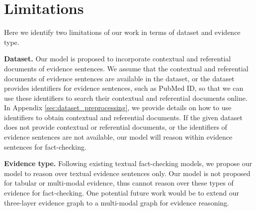 \section*{Limitations}

Here we identify two limitations of our work in terms of dataset and evidence type.

\textbf{Dataset.} Our model is proposed to incorporate contextual and referential documents of evidence sentences. We assume that the contextual and referential documents of evidence sentences are available in the dataset, or the dataset provides identifiers for evidence sentences, such as PubMed ID, so that we can use these identifiers to search their contextual and referential documents online. In Appendix \ref{sec:dataset_preprocessing}, we provide details on how to use identifiers to obtain contextual and referential documents. If the given dataset does not provide contextual or referential documents, or the identifiers of evidence sentences are not available, our model will reason within evidence sentences for fact-checking.

\textbf{Evidence type.} Following existing textual fact-checking models, we propose our model to reason over textual evidence sentences only. Our model is not proposed for tabular or multi-modal evidence, thus cannot reason over these types of evidence for fact-checking. One potential future work would be to extend our three-layer evidence graph to a multi-modal graph for evidence reasoning.